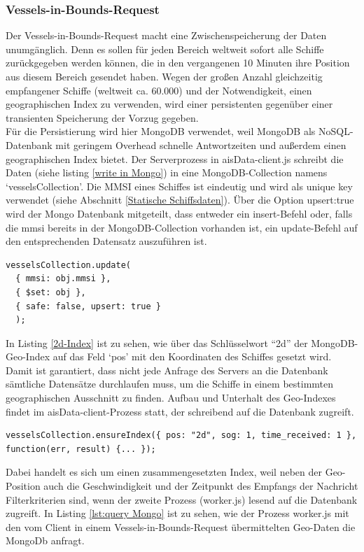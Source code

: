 \subsubsection{Vessels-in-Bounds-Request}\label{Vessels-in-Bounds-Request}
Der Vessels-in-Bounds-Request macht eine Zwischenspeicherung der Daten unumgänglich. Denn es sollen für jeden Bereich weltweit sofort alle Schiffe zurückgegeben werden können, die in den vergangenen 10 Minuten ihre Position aus diesem Bereich gesendet haben. Wegen der großen Anzahl gleichzeitig empfangener Schiffe (weltweit ca. 60.000) und der Notwendigkeit, einen geographischen Index zu verwenden, wird einer persistenten gegenüber einer transienten Speicherung der Vorzug gegeben. 
\\Für die Persistierung wird hier MongoDB verwendet, weil MongoDB als NoSQL-Datenbank mit geringem Overhead schnelle Antwortzeiten und außerdem einen geographischen Index bietet. Der Serverprozess in aisData-client.js schreibt die Daten (siehe listing \ref{write in Mongo}) in eine MongoDB-Collection namens ‘vesselsCollection’. Die MMSI eines Schiffes ist eindeutig und wird als unique key verwendet (siehe Abschnitt \ref{Statische Schiffsdaten}). Über die Option upsert:true wird der Mongo Datenbank mitgeteilt, dass entweder ein insert-Befehl oder, falls die mmsi bereits in der MongoDB-Collection vorhanden ist, ein update-Befehl auf den entsprechenden Datensatz auszuführen ist. 
\begin{lstlisting}[caption=Schreiben in die Datenbank in aisData-client.js, label=write in Mongo]
vesselsCollection.update(
  { mmsi: obj.mmsi },
  { $set: obj },
  { safe: false, upsert: true }
  );
\end{lstlisting}
In Listing \ref{2d-Index} ist zu sehen, wie über das Schlüsselwort “2d” der MongoDB-Geo-Index auf das Feld ‘pos’ mit den Koordinaten des Schiffes gesetzt wird. Damit ist garantiert, dass nicht jede Anfrage des Servers an die Datenbank sämtliche Datensätze durchlaufen muss, um die Schiffe in einem bestimmten geographischen Ausschnitt zu finden. Aufbau und Unterhalt des Geo-Indexes findet im aisData-client-Prozess statt, der schreibend auf die Datenbank zugreift.
\begin{lstlisting}[caption=Aufbau des Geo-Indexes in aisData-client.js, label= 2d-Index]
  vesselsCollection.ensureIndex({ pos: "2d", sog: 1, time_received: 1 }, function(err, result) {... });
  \end{lstlisting}
Dabei handelt es sich um einen zusammengesetzten Index, weil neben der Geo-Position auch die Geschwindigkeit und der Zeitpunkt des Empfangs der Nachricht Filterkriterien sind, wenn der zweite Prozess (worker.js) lesend auf die Datenbank zugreift. In Listing \ref{lst:query Mongo} ist zu sehen, wie der Prozess worker.js mit den vom Client in einem Vessels-in-Bounds-Request übermittelten Geo-Daten die MongoDb anfragt.
